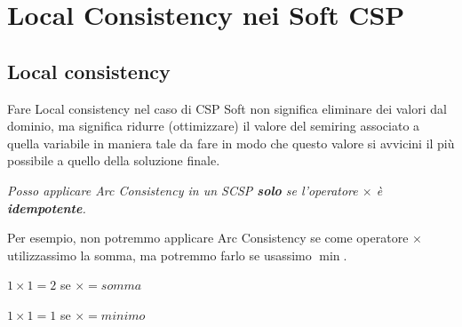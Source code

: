 \chapter{Local Consistency nei Soft CSP} \label{ch:Local Consistency nei Soft
    CSP}
\section{Local consistency}
Fare Local consistency nel caso di CSP Soft non significa eliminare dei valori
dal dominio, ma significa ridurre (ottimizzare) il valore del semiring associato
a quella variabile in maniera tale da fare in modo che questo valore si avvicini
il più possibile a quello della soluzione finale.

\begin{center}
    \textit{Posso applicare Arc Consistency in un SCSP \textbf{solo} se l'operatore $\times$ è
        \textbf{idempotente}.}
\end{center}

Per esempio, non potremmo applicare Arc Consistency se come operatore $\times$
utilizzassimo la somma, ma potremmo farlo se usassimo $\min$.

\begin{center}
    $1 \times 1 = 2$ se $\times = somma$
\end{center}
\begin{center}
    $1 \times 1 = 1$ se $\times = minimo$
\end{center}

